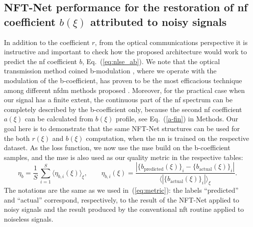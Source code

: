 \subsection{NFT-Net performance for the restoration of \acrshort{nf} coefficient $b(\xi)$ attributed to noisy signals}
In addition to the coefficient $r$, from the optical communications perspective it is instructive and important to check how the proposed architecture would work to predict the \acrshort{nf} coefficient $b$, Eq.~(\ref{eq:nlse_ab}). We note that the optical transmission method coined b-modulation \cite{w17,wsh20,svp20}, where we operate with the modulation of the b-coefficient, has proven to be the most efficacious technique among different \acrshort{nfdm} methods proposed \cite{yal19,yla19}. Moreover, for the practical case when our signal has a finite extent, the continuous part of the \acrshort{nf} spectrum can be completely described by the b-coefficient only, because the second \acrshort{nf} coefficient $a(\xi)$ can be calculated from $b(\xi)$ profile, see Eq.~(\ref{a-fin}) in Methods. Our goal here is to demonstrate that the same NFT-Net structures can be used for the both $r(\xi)$ and $b(\xi)$ computation, when the \acrshort{nn} is trained on the respective dataset. As the loss function, we now use the \acrshort{mse} build on the b-coefficient samples, and the \acrshort{mse} is also used as our quality metric in the respective tables:
\begin{equation}
    \eta_b = \frac{1}{S} \, \sum_{i = 1}^{S} \langle \eta_{b,i}(\xi) \rangle_{\xi}, 
    \qquad 
    \eta_{b,i}(\xi) = \frac{|\{b_\text{predicted}(\xi)\}_i - \{b_\text{actual}(\xi)\}_i| }{\langle |\{b_\text{actual}(\xi)\}_i| \rangle_{\xi}}.
    \label{eq:b_metric}
\end{equation}
The notations are the same as we used in~(\ref{eq:metric}): the labels ``predicted'' and ``actual'' correspond, respectively, to the result of the NFT-Net applied to noisy signals and the result produced by the conventional \acrshort{nft} routine applied to noiseless signals.

